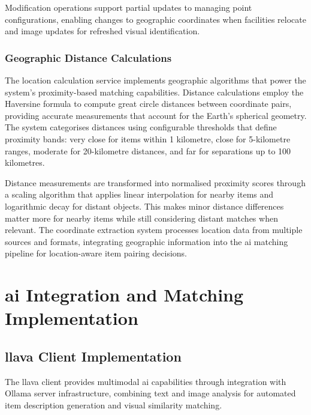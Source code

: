 Modification operations support partial updates to managing point configurations, enabling changes to geographic coordinates when facilities relocate and image updates for refreshed visual identification.

\subsubsection{Geographic Distance Calculations}

The location calculation service implements geographic algorithms that power the system's proximity-based matching capabilities. Distance calculations employ the Haversine formula \cite{Sinnott1984} to compute great circle distances between coordinate pairs, providing accurate measurements that account for the Earth's spherical geometry. The system categorises distances using configurable thresholds that define proximity bands: very close for items within 1 kilometre, close for 5-kilometre ranges, moderate for 20-kilometre distances, and far for separations up to 100 kilometres.

Distance measurements are transformed into normalised proximity scores through a scaling algorithm that applies linear interpolation for nearby items and logarithmic decay for distant objects. This makes minor distance differences matter more for nearby items while still considering distant matches when relevant. The coordinate extraction system processes location data from multiple sources and formats, integrating geographic information into the \ac{ai} matching pipeline for location-aware item pairing decisions.



\section{\ac{ai} Integration and Matching Implementation} \label{section:ai_integration}

\subsection{\ac{llava} Client Implementation} \label{subsection:llava_client}

The \ac{llava} client provides multimodal \ac{ai} capabilities through integration with Ollama server infrastructure, combining text and image analysis for automated item description generation and visual similarity matching.

